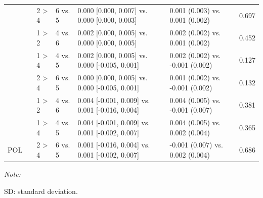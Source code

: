 \documentclass[11pt]{article}
\begin{document}
\begin{table}[!h]
{\begin{threeparttable}
\begin{tabular}[t]{lrlllll}
\cmidrule{3-7}
 & \multirow{-3}{*}{\raggedleft\arraybackslash 0} & 2 > 4 & 6 vs. 5 & 0.000 [0.000, 0.007] vs. 0.000 [0.000, 0.003] & 0.001 (0.003) vs. 0.001 (0.002) & 0.697\\
\cmidrule{2-7}
 &  & 1 > 2 & 4 vs. 6 & 0.002 [0.000, 0.005] vs. 0.000 [0.000, 0.005] & 0.002 (0.002) vs. 0.001 (0.002) & 0.452\\
\cmidrule{3-7}
 &  & 1 > 4 & 4 vs. 5 & 0.002 [0.000, 0.005] vs. 0.000 [-0.005, 0.001] & 0.002 (0.002) vs. -0.001 (0.002) & 0.127\\
\cmidrule{3-7}
 & \multirow{-3}{*}{\raggedleft\arraybackslash 1} & 2 > 4 & 6 vs. 5 & 0.000 [0.000, 0.005] vs. 0.000 [-0.005, 0.001] & 0.001 (0.002) vs. -0.001 (0.002) & 0.132\\
\cmidrule{2-7}
 &  & 1 > 2 & 4 vs. 6 & 0.004 [-0.001, 0.009] vs. 0.001 [-0.016, 0.004] & 0.004 (0.005) vs. -0.001 (0.007) & 0.381\\
\cmidrule{3-7}
 &  & 1 > 4 & 4 vs. 5 & 0.004 [-0.001, 0.009] vs. 0.001 [-0.002, 0.007] & 0.004 (0.005) vs. 0.002 (0.004) & 0.365\\
\cmidrule{3-7}
\multirow{-9}{*}{\raggedright\arraybackslash POL} & \multirow{-3}{*}{\raggedleft\arraybackslash 2} & 2 > 4 & 6 vs. 5 & 0.001 [-0.016, 0.004] vs. 0.001 [-0.002, 0.007] & -0.001 (0.007) vs. 0.002 (0.004) & 0.686\\
\bottomrule
\end{tabular}
\begin{tablenotes}
\item \textit{Note: } 
\item SD: standard deviation.
\end{tablenotes}
\end{threeparttable}}
\end{table}

\clearpage
\end{document}
